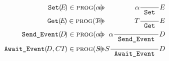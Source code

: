 \begin{eqnarray}
  \texttt{Set}( \! E \! ) \in \text{\scshape prog}(\alpha) \!\!\!  
   & \!\!\! \Leftrightarrow \!\!\! & \!\!\! \alpha  \rset E  \\
  \texttt{Get}(\! E\!)  \in \text{\scshape prog}(T)  \!\!\!
   & \!\!\! \Leftrightarrow \!\!\! & \!\!\! T \rget E  \\
  \texttt{Send\_Event}(\! D \!) \in \text{\scshape prog}(\alpha) \!\!\! 
   & \!\!\! \Leftrightarrow \!\!\! & \!\!\! \alpha \rsvt D \\
  \texttt{Await\_Event}(\! D, CT \! ) \in \text{\scshape prog}(S) \!\!\!
   & \!\!\! \Leftrightarrow \!\!\! & \!\!\! S \rgvt D
\end{eqnarray}





